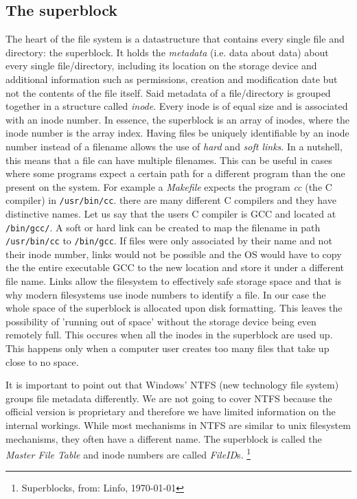 \subsection{The superblock}

The heart of the file system is a datastructure that contains every single file and directory: the
superblock. It holds the \textit{metadata} (i.e. data about data) about every single file/directory,
including its location on the storage device and additional information such as permissions, creation
and modification date but not the contents of the file itself. Said metadata of a file/directory is
grouped together in a structure called \textit{inode}. Every inode is of equal size and is associated
with an inode number. In essence, the superblock is an array of inodes, where the inode number is the
array index. Having files be uniquely identifiable by an inode number instead of a filename allows 
the use of \textit{hard} and \textit{soft links}. In a nutshell, this means that a file can have multiple filenames.
This can be useful in cases where some programs expect a certain path for a different program than the
one present on the system. For example a \textit{Makefile} expects the program \textit{cc} (the C compiler) in
\texttt{/usr/bin/cc}. there are many different C compilers and they have distinctive names. Let us say that the
users C compiler is GCC and located at \texttt{/bin/gcc/}. A soft or hard link can be created to map the
filename in path \texttt{/usr/bin/cc} to \texttt{/bin/gcc}. If files were only associated by their name and not 
their inode number, links would not be possible and the OS would have to copy the the entire
executable GCC to the new location and store it under a different file name. Links allow the
filesystem to effectively safe storage space and that is why modern filesystems use inode numbers to
identify a file. In our case the whole space of the superblock is allocated upon disk formatting.
This leaves the possibility of 'running out of space' without the storage device being even remotely
full. This occures when all the inodes in the superblock are used up. This happens only when a
computer user creates too many files that take up close to no space.

It is important to point out that Windows' NTFS (new technology file system) groups file metadata differently. 
We are not going to cover NTFS because the official version is proprietary and therefore we have limited 
information on the internal workings. While most mechanisms in NTFS are similar to
unix filesystem mechanisms, they often have a different name. The superblock is called the \textit{Master
File Table} and inode numbers are called \textit{FileID}s. \footnote{Superblocks, from: Linfo, \today  }

